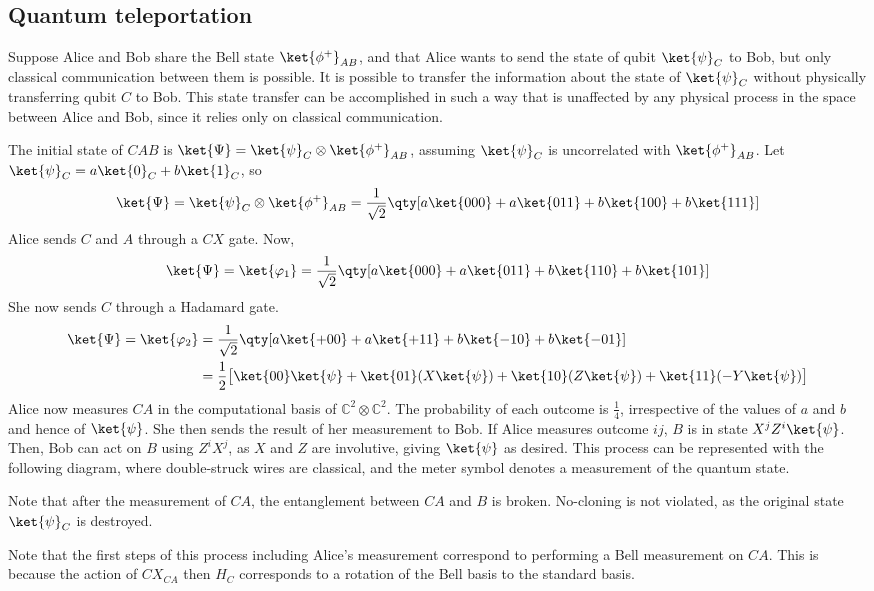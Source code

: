 \subsection{Quantum teleportation}
Suppose Alice and Bob share the Bell state $\ket{\phi^+}_{AB}$, and that Alice wants to send the state of qubit $\ket{\psi}_C$ to Bob, but only classical communication between them is possible.
It is possible to transfer the information about the state of $\ket{\psi}_C$ without physically transferring qubit $C$ to Bob.
This state transfer can be accomplished in such a way that is unaffected by any physical process in the space between Alice and Bob, since it relies only on classical communication.

The initial state of $C A B$ is $\ket{\Psi} = \ket{\psi}_C \otimes \ket{\phi^+}_{AB}$, assuming $\ket{\psi}_C$ is uncorrelated with $\ket{\phi^+}_{AB}$.
Let $\ket{\psi}_C = a \ket{0}_C + b \ket{1}_C$, so
\[ \ket{\Psi} = \ket{\psi}_C \otimes \ket{\phi^+}_{AB} = \frac{1}{\sqrt{2}} \qty[a \ket{000} + a \ket{011} + b \ket{100} + b \ket{111}] \]
Alice sends $C$ and $A$ through a $CX$ gate.
Now,
\[ \ket{\Psi} = \ket{\varphi_1} = \frac{1}{\sqrt{2}} \qty[a \ket{000} + a \ket{011} + b \ket{110} + b \ket{101}] \]
She now sends $C$ through a Hadamard gate.
\begin{align*}
    \ket{\Psi} = \ket{\varphi_2} &= \frac{1}{\sqrt{2}} \qty[a \ket{+00} + a \ket{+11} + b \ket{-10} + b \ket{-01}] \\
    &= \frac{1}{2} \big[\ket{00} \ket{\psi} + \ket{01} (X \ket{\psi}) + \ket{10} (Z \ket{\psi}) + \ket{11} (-Y\ket{\psi})\big]
\end{align*}
Alice now measures $CA$ in the computational basis of $\mathbb C^2 \otimes \mathbb C^2$.
The probability of each outcome is $\frac{1}{4}$, irrespective of the values of $a$ and $b$ and hence of $\ket{\psi}$.
She then sends the result of her measurement to Bob.
If Alice measures outcome $ij$, $B$ is in state $X^j Z^i \ket{\psi}$.
Then, Bob can act on $B$ using $Z^i X^j$, as $X$ and $Z$ are involutive, giving $\ket{\psi}$ as desired.
This process can be represented with the following diagram, where double-struck wires are classical, and the meter symbol denotes a measurement of the quantum state.
\begin{center}
    \leavevmode
\end{center}
Note that after the measurement of $CA$, the entanglement between $CA$ and $B$ is broken.
No-cloning is not violated, as the original state $\ket{\psi}_C$ is destroyed.

Note that the first steps of this process including Alice's measurement correspond to performing a Bell measurement on $CA$.
This is because the action of $CX_{CA}$ then $H_C$ corresponds to a rotation of the Bell basis to the standard basis.
